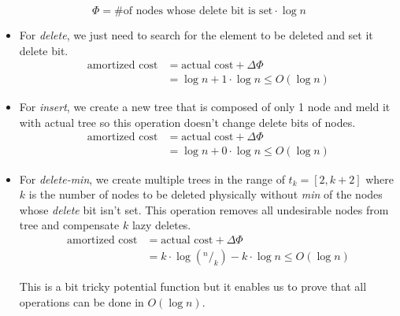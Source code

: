 \begin{enumerate}
 $$
  \Phi = \text{\# of nodes whose delete bit is set} \cdot \log n
 $$
 
 \begin{itemize}
   \item For \textit{delete}, we just need to search for the element to be deleted and set it delete bit.
   \begin{align*}
    \text{amortized cost} &= \text{actual cost} + \Delta\Phi \\                          
                          &= \log n + 1 \cdot \log n \leq O(\log n)   
   \end{align*}
   
   \item For \textit{insert}, we create a new tree that is composed of only 1 node and meld it with actual tree so this operation doesn't change delete bits of nodes.
   \begin{align*}
    \text{amortized cost} &= \text{actual cost} + \Delta\Phi \\                          
                          &= \log n + 0 \cdot \log n \leq O(\log n)   
   \end{align*}
   
   \item For \textit{delete-min}, we create multiple trees in the range of $t_k = [2, k+2]$ where $k$ is the number of nodes to be deleted physically without \textit{min} of the nodes whose \textit{delete} bit isn't set. This operation removes all undesirable nodes from tree and compensate $k$ lazy deletes.
   \begin{align*}
    \text{amortized cost} &= \text{actual cost} + \Delta\Phi \\                          
                          &= k \cdot \log (^n/_k) - k \cdot \log n \leq O(\log n)   
   \end{align*}
   
   This is a bit tricky potential function but it enables us to prove that all operations can be done in $O(\log n)$.
   
 \end{itemize}

\end{enumerate}